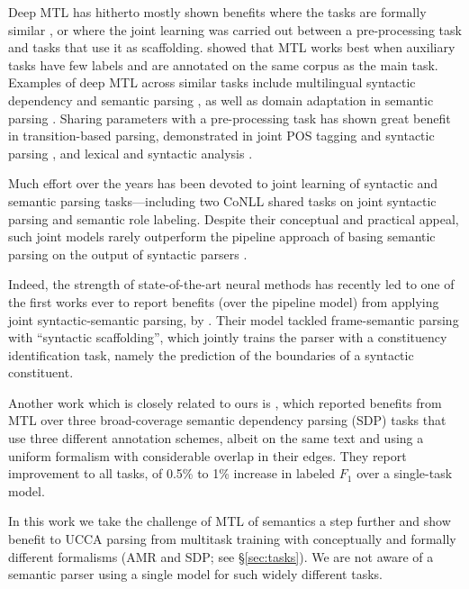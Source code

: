 \documentclass[11pt,a4paper]{article}
\begin{document}
Deep MTL has hitherto mostly shown benefits where the tasks
are formally similar \cite{P15-1166,P16-2038,D17-1134},
or where the joint learning was carried out between a pre-processing task and tasks that use it
as scaffolding.
\citet{E17-1005} showed that MTL works best when auxiliary tasks have few labels
and are annotated on the same corpus as the main task.
Examples of deep MTL across similar tasks include 
multilingual syntactic dependency \cite{Q16-1031,guo2016exploiting}
and semantic parsing \cite{duong2017multilingual},
as well as domain adaptation in semantic parsing \cite{herzig-berant:2017:Short,W17-2607}.
Sharing parameters with a pre-processing task
has shown great benefit in transition-based parsing, demonstrated in
joint POS tagging and syntactic parsing
\cite{bohnet2012transition,Zhang2016StackpropagationIR}, and
lexical and syntactic analysis \cite{constant-nivre:2016:P16-1,more2016joint}.

Much effort over the years has been devoted to joint learning of syntactic
and semantic parsing tasks---including
two CoNLL shared tasks \cite{surdeanu2008conll,hajivc2009conll} on joint syntactic
parsing and semantic role labeling.
Despite their conceptual and practical appeal, such joint models rarely outperform
the pipeline approach of basing semantic parsing on the output of syntactic parsers
\cite{lluis2008joint,henderson2013multilingual,D15-1169,swayamdipta-EtAl:2016:CoNLL}.

Indeed, the strength of state-of-the-art neural methods has recently led to 
one of the first works ever to report benefits (over the pipeline model) from 
applying joint syntactic-semantic parsing, by \citet{swayamdipta2017frame}.
Their model tackled frame-semantic parsing with ``syntactic scaffolding'',
which jointly trains the parser with a constituency identification task, 
namely the prediction of the boundaries of a syntactic
constituent. 

Another work which is closely related to ours is \citet{P17-1186},
which reported benefits from MTL over three broad-coverage semantic dependency parsing (SDP)
tasks that use three different annotation schemes, albeit on the same text and using a uniform formalism with 
considerable overlap in their edges.
They report improvement to all tasks, of 0.5\% to 1\% increase in labeled $F_1$ over a single-task model.

In this work we take the challenge of MTL of semantics a step further and 
show benefit to UCCA parsing from multitask 
training with conceptually and formally different formalisms (AMR and SDP; see \S\ref{sec:tasks}).
We are not aware of a semantic parser using a single model for
such widely different tasks.
\end{document}
